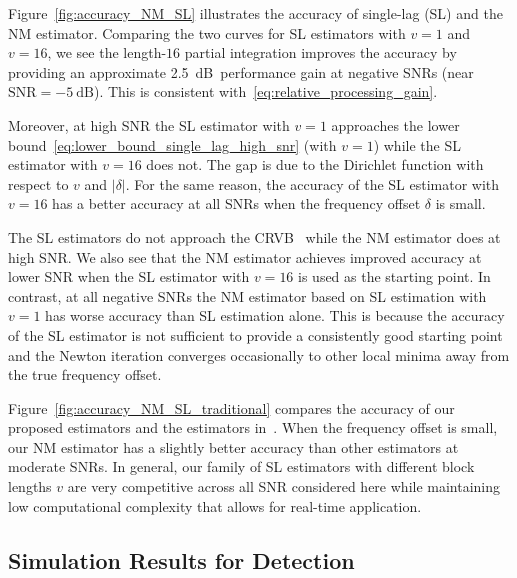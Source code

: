Figure~\ref{fig:accuracy_NM_SL} illustrates the accuracy of single-lag (SL) and the NM estimator.
Comparing the two curves for SL estimators with $v{=}1$ and $v{=}16$, 
we see the length-$16$ partial integration
improves the accuracy by providing an approximate
\SI{2.5}{\dB}~performance gain at negative SNRs
(near $\text{SNR}=\SI{-5}{\dB}$). This is consistent
with~\eqref{eq:relative_processing_gain}.

Moreover, at high SNR the SL estimator with $v{=}1$ approaches the lower bound~\eqref{eq:lower_bound_single_lag_high_snr} (with $v=1$)
while the SL estimator with $v{=}16$ does not. 
The gap is due to the Dirichlet function 
with respect to $v$ and $|\delta|$.
For the same reason, the accuracy of the SL estimator with $v=16$ has
a better accuracy at all SNRs when the frequency offset $\delta$ is small.

The SL estimators do not approach the CRVB~\cite{Gini_98} while the NM
estimator does at high SNR. 
We also see that the NM estimator achieves improved accuracy at lower SNR
when the SL estimator with $v=16$ is used as the starting point. 
In contrast, at all negative SNRs the NM estimator based on SL estimation with $v=1$ has
worse accuracy than SL estimation alone.
This is because the accuracy of the SL estimator is not sufficient to
provide a consistently good starting point and the Newton iteration converges occasionally to 
other local minima away from the true frequency offset.

Figure~\ref{fig:accuracy_NM_SL_traditional} compares the accuracy of our proposed estimators
and the estimators in~\cite{kay_89,Fitz_94,Luise_Reggiannini_95}.
When the 
frequency offset is small, our NM estimator has a slightly better accuracy than other estimators at moderate SNRs.
In general, our family of  SL estimators with different block lengths $v$
are very competitive across all SNR considered here while maintaining
low computational complexity that allows for real-time application.

\subsection{Simulation Results for Detection}


